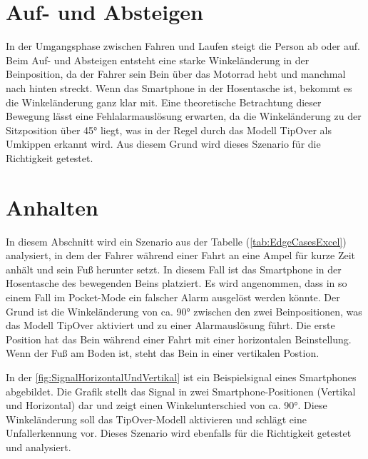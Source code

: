 \section{Auf- und Absteigen} \label{sec:AufAbsteigen}
In der Umgangsphase zwischen Fahren und Laufen steigt die Person ab oder auf. Beim Auf- und Absteigen entsteht eine starke Winkeländerung in der Beinposition, da der Fahrer sein Bein über das Motorrad hebt und manchmal nach hinten streckt. Wenn das Smartphone in der Hosentasche ist, bekommt es die Winkeländerung ganz klar mit.
Eine theoretische Betrachtung dieser Bewegung lässt eine Fehlalarmauslösung erwarten, da die Winkeländerung zu der Sitzposition über \ang{45} liegt, was in der Regel durch das Modell \glqq TipOver\grqq{} als Umkippen erkannt wird.
Aus diesem Grund wird dieses Szenario für die Richtigkeit getestet.






\section{Anhalten} \label{sec:AmpelStehen}
In diesem Abschnitt wird ein Szenario aus der Tabelle (\autoref{tab:EdgeCasesExcel}) analysiert, in dem der Fahrer während einer Fahrt an eine Ampel für kurze Zeit anhält und sein Fuß herunter setzt. In diesem Fall ist das Smartphone in der Hosentasche des bewegenden Beins platziert.
Es wird angenommen, dass in so einem Fall im Pocket-Mode ein falscher Alarm ausgelöst werden könnte. Der Grund ist die Winkeländerung von ca. \ang{90} zwischen den zwei Beinpositionen, was das Modell \glqq TipOver\grqq{} aktiviert und zu einer Alarmauslösung führt.
Die erste Position hat das Bein während einer Fahrt mit einer horizontalen Beinstellung. Wenn der Fuß am Boden ist, steht das Bein in einer vertikalen Postion.

In der \autoref{fig:SignalHorizontalUndVertikal} ist ein Beispielsignal eines Smartphones abgebildet. Die Grafik stellt das Signal in zwei Smartphone-Positionen (Vertikal und Horizontal) dar und zeigt einen Winkelunterschied von ca. \ang{90}. Diese Winkeländerung soll das \glqq TipOver\grqq{}-Modell aktivieren und schlägt eine Unfallerkennung vor.
Dieses Szenario wird ebenfalls für die Richtigkeit getestet und analysiert.

